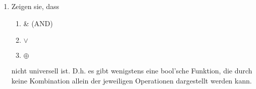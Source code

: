 \documentclass[paper=a4,fontsize=11pt]{scrartcl}%
\numberwithin{equation}{section}
\newenvironment{solution}
	{
		\color{Blue}
		\textbf{Lösung:}
	}{}
\begin{document}
\begin{enumerate}
\begin{solution}
\begin{enumerate}
\begin{proof}
$\downarrow$ kann durch kombiniertes Anwenden von $\uparrow$ dargestellt werden\\
Idee: nach anwenden von de Morgan: $A \downarrow B \Leftrightarrow \neg (A \lor B) \Leftrightarrow \neg A \& \neg B$\\
Da wir schon den binären Operator $\lor$ bewiesen haben wenden wir nun noch den unären Operator $\neg$ darauf an. Somit ergibt sich:\\
$((A \uparrow A) \uparrow (B \uparrow B)) \uparrow ((A \uparrow A) \uparrow (B \uparrow B))$
\end{proof}
\item $\oplus$ 
\begin{proof}
$\oplus$ kann durch kombiniertes Anwenden von $\uparrow$ dargestellt werden\\
Idee: Wir brauchen einen ausschließendes Oder, M.a.W nur die Tupel TRUE FALSE, FALSE TRUE ergeben wahr. 
Demnach suchen wir eine Operation, die nur bei der Verknüpfung von A und B wahr liefert, wenn ein Eingang wahr ist und der zweite falsch. Die kann durch $(\alpha \& \neg \beta)$ realisiert werden. Verknüpfen wir so unsere beiden Eingaben mittels $\lor$ werden nur die Eingaben TRUE liefern, die mindestens ein TRUE-Wert haben.\\
$(A \oplus B) \Leftrightarrow (A \& \neg B) \lor (\neg A \& B)$\\
$\Leftrightarrow (A \& (B \uparrow B)) \lor ((A \uparrow A) \& B) $ Negation von B, wie oben\\
$\Leftrightarrow [(A \uparrow (B \uparrow B))\uparrow (A \uparrow (B \uparrow B))] $
$ \lor [ ((A \uparrow A) \uparrow B) \uparrow ((A \uparrow A) \uparrow B)] $ \\
$\Leftrightarrow [(A \uparrow (B \uparrow B))\uparrow (A \uparrow (B \uparrow B)) \uparrow (A \uparrow (B \uparrow B))\uparrow (A \uparrow (B \uparrow B))]$ \\
$ \uparrow [ ((A \uparrow A) \uparrow B) \uparrow ((A \uparrow A) \uparrow B) \uparrow ((A \uparrow A) \uparrow B) \uparrow ((A \uparrow A) \uparrow B)] $\\
$\Leftrightarrow ((A \uparrow B) \uparrow B) \uparrow ((B \uparrow A) \uparrow A)$
\end{proof}
\end{enumerate}
	\end{solution}
	\item Zeigen sie, dass 
	\begin{enumerate}
		\item \& (AND)
		\item $\lor$
		\item $\oplus$
	\end{enumerate}
	nicht universell ist. D.h. es gibt wenigstens eine bool'sche Funktion, die durch keine Kombination allein der jeweiligen Operationen dargestellt werden kann. 
	

\end{enumerate}
\end{document}
